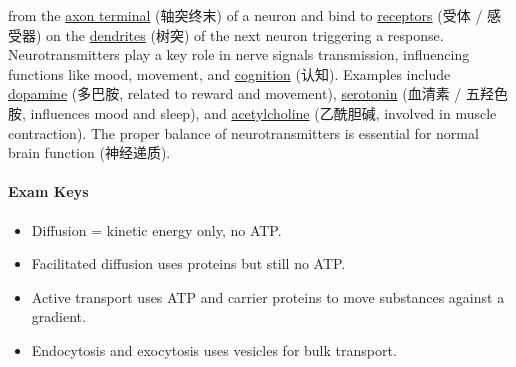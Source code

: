 \begin{itemize}
\begin{itemize}
{        from the \underline{axon terminal} (轴突终末) of a neuron and bind to \underline{receptors} (受体 / 感受器) on the
        \underline{dendrites} (树突) of the next neuron triggering a response. Neurotransmitters play a key role in nerve signals
        transmission, influencing functions like mood, movement, and \underline{cognition} (认知). Examples include
        \underline{dopamine} (多巴胺, related to reward and movement), \underline{serotonin} (血清素 / 五羟色胺, influences mood
        and sleep), and \underline{acetylcholine} (乙酰胆碱, involved in muscle contraction). The proper balance of
        neurotransmitters is essential for normal brain function} (神经递质).
    \end{itemize}
\end{itemize}

\paragraph{Exam Keys}
\begin{itemize}
    \item Diffusion = kinetic energy only, no ATP.
    \item Facilitated diffusion uses proteins but still no ATP.
    \item Active transport uses ATP and carrier proteins to move substances against a gradient.
    \item Endocytosis and exocytosis uses vesicles for bulk transport.
\end{itemize}